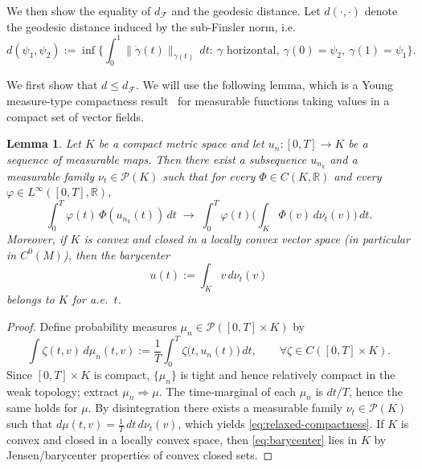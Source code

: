 \documentclass[12pt]{amsart}
\numberwithin{equation}{section}
\newtheorem{lemma}{Lemma}[section]
\theoremstyle{remark}
\begin{document}
\medskip

We then show the equality of $d_{\mathcal F}$ and the geodesic distance.
Let $d(\cdot,\cdot)$ denote the geodesic distance induced by the sub-Finsler norm, i.e.
\begin{equation}
d(\psi_1,\psi_2):=\inf\Big\{\int_0^1\|\dot\gamma(t)\|_{\gamma(t)}\,dt:\ \gamma \text{ horizontal},\ \gamma(0)=\psi_2,\ \gamma(1)=\psi_1\Big\}.
\end{equation}



We first show that $d\le d_{\mathcal F}$. We will use the following lemma, which is a Young measure-type compactness result~\cite{ball2005version} for measurable functions taking values in a compact set of vector fields. 

\begin{lemma}
\label{lem:relaxed-compactness}
Let $K$ be a compact metric space and let $u_n:[0,T]\to K$ be a sequence of measurable maps.
Then there exist a subsequence $u_{n_k}$  and a measurable family
$\nu_t\in\mathcal P(K)$ such that for every $\Phi\in C(K,\mathbb R)$ and every
$\varphi\in L^\infty([0,T], \mathbb R)$,
\begin{equation}
\label{eq:relaxed-compactness}
\int_0^T \varphi(t)\,\Phi(u_{n_k}(t))\,dt
\;\longrightarrow\;
\int_0^T \varphi(t)\Big(\int_K \Phi(v)\,d\nu_t(v)\Big)\,dt.
\end{equation}
Moreover, if $K$ is convex and closed in a locally convex vector space
(in particular in $C^0(M)$), then the barycenter
\begin{equation}
\label{eq:barycenter}
u(t):=\int_K v\,d\nu_t(v)
\end{equation}
belongs to $K$ for a.e.\ $t$.
\end{lemma}

\begin{proof}
Define probability measures $\mu_n\in\mathcal P([0,T]\times K)$ by
\[
\int \zeta(t,v)\,d\mu_n(t,v):=\frac1T\int_0^T \zeta\big(t,u_n(t)\big)\,dt,
\qquad \forall \zeta\in C([0,T]\times K).
\]
Since $[0,T]\times K$ is compact, $\{\mu_n\}$ is tight and hence relatively compact
in the weak topology; extract $\mu_n\Rightarrow \mu$.
The time-marginal of each $\mu_n$ is $dt/T$, hence the same holds for $\mu$.
By disintegration there exists a measurable family $\nu_t\in\mathcal P(K)$ such that
$d\mu(t,v)=\frac1T\,dt\,d\nu_t(v)$, which yields \eqref{eq:relaxed-compactness}.
If $K$ is convex and closed in a locally convex space, then \eqref{eq:barycenter}
lies in $K$ by Jensen/barycenter properties of convex closed sets.
\end{proof}
\end{document}

